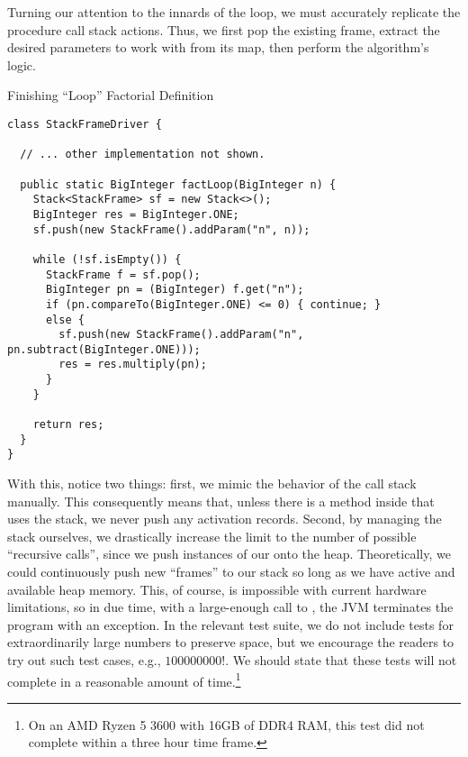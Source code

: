 Turning our attention to the innards of the loop, we must accurately replicate the procedure call stack actions. Thus, we first pop the existing frame, extract the desired parameters to work with from its map, then perform the algorithm's logic.

\begin{cl}{Finishing ``Loop'' Factorial Definition}
\begin{lstlisting}[language=MyJava]
class StackFrameDriver {

  // ... other implementation not shown.

  public static BigInteger factLoop(BigInteger n) {
    Stack<StackFrame> sf = new Stack<>();
    BigInteger res = BigInteger.ONE;
    sf.push(new StackFrame().addParam("n", n));

    while (!sf.isEmpty()) {
      StackFrame f = sf.pop();
      BigInteger pn = (BigInteger) f.get("n");
      if (pn.compareTo(BigInteger.ONE) <= 0) { continue; }
      else {
        sf.push(new StackFrame().addParam("n", pn.subtract(BigInteger.ONE)));
        res = res.multiply(pn);
      }
    }

    return res;
  }
}
\end{lstlisting}
\end{cl}

With this, notice two things: first, we mimic the behavior of the call stack manually. This consequently means that, unless there is a method inside that uses the stack, we never push any activation records. Second, by managing the stack ourselves, we drastically increase the limit to the number of possible ``recursive calls'', since we push instances of our  onto the heap. Theoretically, we could continuously push new ``frames'' to our stack so long as we have active and available heap memory. This, of course, is impossible with current hardware limitations, so in due time, with a large-enough call to , the JVM terminates the program with an  exception. In the relevant test suite, we do not include tests for extraordinarily large numbers to preserve space, but we encourage the readers to try out such test cases, e.g., $100000000!$. We should state that these tests will not complete in a reasonable amount of time.\footnote{On an AMD Ryzen 5 3600 with 16GB of DDR4 RAM, this test did not complete within a three hour time frame.} 
